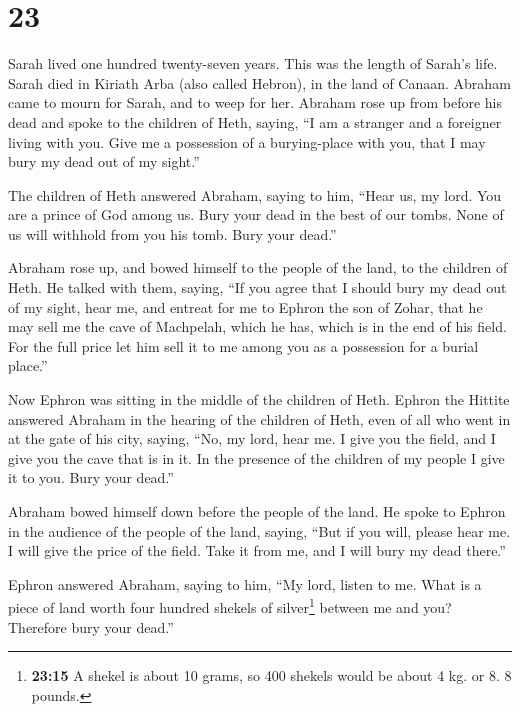 \hypertarget{section-22}{%
\section{23}\label{section-22}}

 Sarah lived one hundred twenty-seven years. This was the
length of Sarah's life.  Sarah died in Kiriath Arba (also
called Hebron), in the land of Canaan. Abraham came to mourn for Sarah,
and to weep for her.  Abraham rose up from before his dead
and spoke to the children of Heth, saying,  ``I am a
stranger and a foreigner living with you. Give me a possession of a
burying-place with you, that I may bury my dead out of my sight.''

 The children of Heth answered Abraham, saying to him,
 ``Hear us, my lord. You are a prince of God among us.
Bury your dead in the best of our tombs. None of us will withhold from
you his tomb. Bury your dead.''

 Abraham rose up, and bowed himself to the people of the
land, to the children of Heth.  He talked with them,
saying, ``If you agree that I should bury my dead out of my sight, hear
me, and entreat for me to Ephron the son of Zohar,  that
he may sell me the cave of Machpelah, which he has, which is in the end
of his field. For the full price let him sell it to me among you as a
possession for a burial place.''

 Now Ephron was sitting in the middle of the children of
Heth. Ephron the Hittite answered Abraham in the hearing of the children
of Heth, even of all who went in at the gate of his city, saying,
 ``No, my lord, hear me. I give you the field, and I give
you the cave that is in it. In the presence of the children of my people
I give it to you. Bury your dead.''

 Abraham bowed himself down before the people of the
land.  He spoke to Ephron in the audience of the people
of the land, saying, ``But if you will, please hear me. I will give the
price of the field. Take it from me, and I will bury my dead there.''

 Ephron answered Abraham, saying to him, 
``My lord, listen to me. What is a piece of land worth four hundred
shekels of silver\footnote{\textbf{23:15} A shekel is about 10 grams, so
  400 shekels would be about 4 kg. or 8. 8 pounds.} between me and you?
Therefore bury your dead.''

